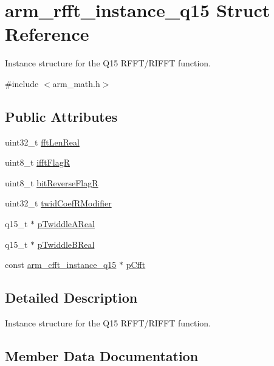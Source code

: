 \hypertarget{structarm__rfft__instance__q15}{}\section{arm\+\_\+rfft\+\_\+instance\+\_\+q15 Struct Reference}
\label{structarm__rfft__instance__q15}


Instance structure for the Q15 R\+F\+F\+T/\+R\+I\+F\+FT function.  




{\ttfamily \#include $<$arm\+\_\+math.\+h$>$}

\subsection*{Public Attributes}
\begin{DoxyCompactItemize}
\item 
uint32\+\_\+t \hyperlink{structarm__rfft__instance__q15_aac5cf9e825917cbb14f439e56bb86ab3}{fft\+Len\+Real}
\item 
uint8\+\_\+t \hyperlink{structarm__rfft__instance__q15_a8051ffe268c147e431e1bea7bb4c4258}{ifft\+FlagR}
\item 
uint8\+\_\+t \hyperlink{structarm__rfft__instance__q15_a4c65cd40e0098ec2f5c0dc31488b9bc6}{bit\+Reverse\+FlagR}
\item 
uint32\+\_\+t \hyperlink{structarm__rfft__instance__q15_afd444d05858c5f419980e94e8240d5c3}{twid\+Coef\+R\+Modifier}
\item 
q15\+\_\+t $\ast$ \hyperlink{structarm__rfft__instance__q15_affbf2de522ac029432d98e8373c0ec53}{p\+Twiddle\+A\+Real}
\item 
q15\+\_\+t $\ast$ \hyperlink{structarm__rfft__instance__q15_a937d815022adc557b435ba8c6cd58b0d}{p\+Twiddle\+B\+Real}
\item 
const \hyperlink{structarm__cfft__instance__q15}{arm\+\_\+cfft\+\_\+instance\+\_\+q15} $\ast$ \hyperlink{structarm__rfft__instance__q15_a4329c15b056444746d37ff082a24d31a}{p\+Cfft}
\end{DoxyCompactItemize}


\subsection{Detailed Description}
Instance structure for the Q15 R\+F\+F\+T/\+R\+I\+F\+FT function. 

\subsection{Member Data Documentation}
